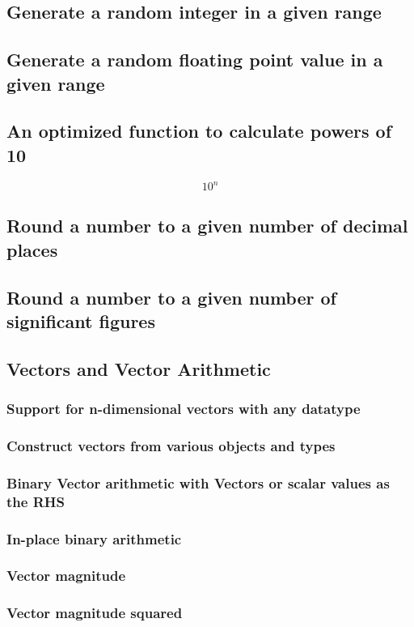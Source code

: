 \documentclass[10pt,a4paper]{report}
\begin{document}
		\subsection{Generate a random integer in a given range}
		\subsection{Generate a random floating point value in a given range}
		\subsection{An optimized function to calculate powers of 10}
			$$10^n$$
		\subsection{Round a number to a given number of decimal places}
		\subsection{Round a number to a given number of significant figures}
		\subsection{Vectors and Vector Arithmetic}
			\subsubsection{Support for n-dimensional vectors with any datatype}
			\subsubsection{Construct vectors from various objects and types}
			\subsubsection{Binary Vector arithmetic with Vectors or scalar values as the RHS}
			\subsubsection{In-place binary arithmetic}
			\subsubsection{Vector magnitude}
			\subsubsection{Vector magnitude squared}
\end{document}
